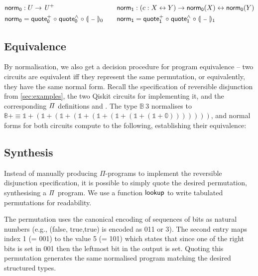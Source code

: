 \begin{definition}
  \begin{gather*}
    \begin{aligned}
      \normt_{0} & : U \to \UPlus                                            \\
      \normt_{0} & = \quotep_{0} \comp \quoteh_{0} \comp \gdenot{\blank}_{0}
    \end{aligned}
    \qquad
    \begin{aligned}
      \normt_{1} & : (c : X \iso Y) \to \normt_{0}(X) \iso \normt_{0}(Y)     \\
      \normt_{1} & = \quotep_{1} \comp \quoteh_{1} \comp \gdenot{\blank}_{1}
    \end{aligned}
  \end{gather*}
\end{definition}

\subsection{Equivalence}

By normalisation, we also get a decision procedure for program equivalence -- two circuits are equivalent iff they
represent the same permutation, or equivalently, they have the same normal form. Recall the specification of reversible
disjunction from \cref{sec:examples}, the two Qiskit circuits for implementing it, and the corresponding $\mathit{\Pi}$
definitions  and . The type $\mathbb{B}\ 3$ normalises to
$\mathbb{8}+ \equiv \mathbb{1} + (\mathbb{1} + (\mathbb{1} + (\mathbb{1} + (\mathbb{1} + (\mathbb{1} + (\mathbb{1} + (\mathbb{1} + \mathbb{0})))))))$,
and normal forms for both circuits compute to the following, establishing their equivalence:

\medskip
\resetnormtwo{}

\subsection{Synthesis}

Instead of manually producing $\Pi$-programs to implement the reversible disjunction specification, it is possible to
simply quote the desired permutation, synthesising a $\mathit{\Pi}$ program. We use a function $\operatorname{\mathsf{lookup}}$ to write
tabulated permutations for readability.

\medskip
\resetperm{}

\noindent
The permutation uses the canonical encoding of sequences of bits as natural numbers (e.g., (\textsf{false},
\textsf{true},\textsf{true}) is encoded as 011 or 3). The second entry maps index 1 (= 001) to the value 5 (= 101) which
states that since one of the right bits is set in 001 then the leftmost bit in the output is set. Quoting this
permutation generates the same normalised program matching the desired structured types.

